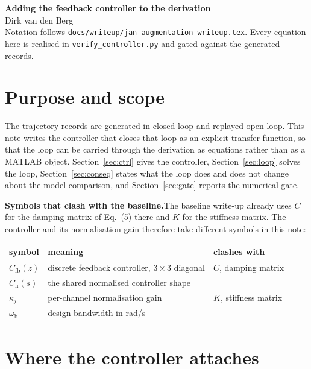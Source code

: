 \documentclass[11pt]{article}
\newcommand{\Cfb}{C_{\mathrm{fb}}}
\newcommand{\Cnorm}{C_{\mathrm{n}}}
\begin{document}
\begin{center}
  {\LARGE\bfseries Adding the feedback controller to the derivation}\\[0.4em]
  {\large Dirk van den Berg}\\[0.2em]
  {\small Notation follows \texttt{docs/writeup/jan-augmentation-writeup.tex}. Every equation
  here is realised in \texttt{verify\_controller.py} and gated against the generated records.}
\end{center}
\vspace{0.4em}

\section{Purpose and scope}

The trajectory records are generated in closed loop and replayed open loop. This note writes the
controller that closes that loop as an explicit transfer function, so that the loop can be
carried through the derivation as equations rather than as a MATLAB object. Section~\ref{sec:ctrl}
gives the controller, Section~\ref{sec:loop} solves the loop, Section~\ref{sec:conseq} states
what the loop does and does not change about the model comparison, and Section~\ref{sec:gate}
reports the numerical gate.

\medskip\noindent\textbf{Symbols that clash with the baseline.}\quad The baseline write-up already
uses $C$ for the damping matrix of Eq.~(5) there and $K$ for the stiffness matrix. The controller
and its normalisation gain therefore take different symbols in this note:

\begin{center}
\begin{tabular}{lll}
\toprule
symbol & meaning & clashes with \\
\midrule
$\Cfb(z)$ & discrete feedback controller, $3\times3$ diagonal & $C$, damping matrix \\
$\Cnorm(s)$ & the shared normalised controller shape & \\
$\kappa_j$ & per-channel normalisation gain & $K$, stiffness matrix \\
$\omega_{\mathrm{b}}$ & design bandwidth in rad/s & \\
\bottomrule
\end{tabular}
\end{center}

\section{Where the controller attaches}
\end{document}

